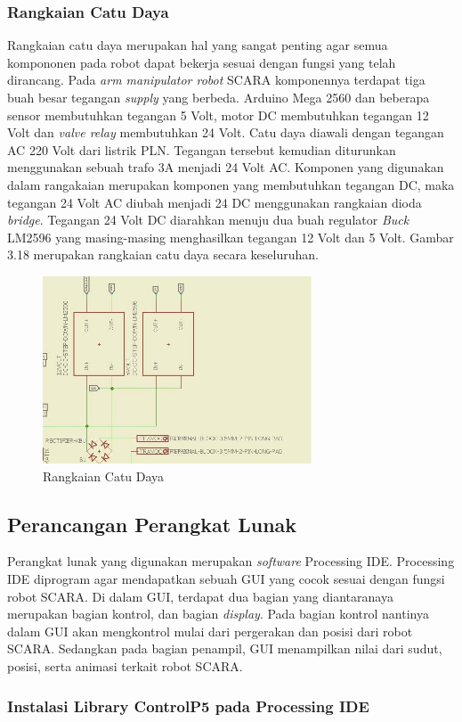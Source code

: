 \subsubsection{Rangkaian Catu Daya}
Rangkaian catu daya merupakan hal yang sangat penting agar semua kompononen pada robot dapat bekerja sesuai dengan fungsi yang telah dirancang. Pada \textit{arm manipulator robot} SCARA komponennya terdapat tiga buah besar tegangan \textit{supply} yang berbeda. Arduino Mega 2560 dan beberapa sensor membutuhkan tegangan 5 Volt, motor DC membutuhkan tegangan 12 Volt dan \textit{valve relay} membutuhkan 24 Volt. Catu daya diawali dengan tegangan AC 220 Volt dari listrik PLN. Tegangan tersebut kemudian diturunkan menggunakan sebuah trafo 3A menjadi 24 Volt AC. Komponen yang digunakan dalam rangakaian merupakan komponen yang membutuhkan tegangan DC, maka tegangan 24 Volt AC diubah menjadi 24 DC menggunakan rangkaian dioda \textit{bridge}. Tegangan 24 Volt DC diarahkan menuju dua buah regulator \textit{Buck} LM2596 yang masing-masing menghasilkan tegangan 12 Volt dan 5 Volt. Gambar 3.18 merupakan rangkaian catu daya secara keseluruhan.
\begin{figure}[H]
	\centering
	\includegraphics[width=8cm]{gambar/catudayasementara.jpg}
	\caption{Rangkaian Catu Daya}
\end{figure}
\subsection{Perancangan Perangkat Lunak}
Perangkat lunak yang digunakan merupakan \textit{software} Processing IDE. Processing IDE diprogram agar mendapatkan sebuah GUI yang cocok sesuai dengan fungsi robot SCARA. Di dalam GUI, terdapat dua bagian yang diantaranaya merupakan bagian kontrol, dan bagian \textit{display}. Pada bagian kontrol nantinya dalam GUI akan mengkontrol mulai dari pergerakan dan posisi dari robot SCARA. Sedangkan pada bagian penampil, GUI menampilkan nilai dari sudut, posisi, serta animasi terkait robot SCARA.
\subsubsection{Instalasi Library ControlP5 pada Processing IDE}

